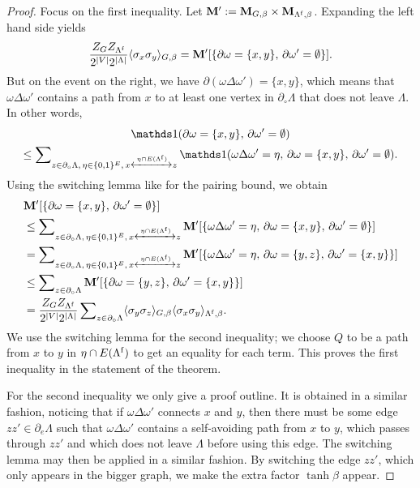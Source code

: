 \begin{proof}
    Focus on the first inequality.
    Let $\mathbf{M}':=\mathbf{M}_{G,\beta}\times\mathbf{M}_{\Lambda^{\operatorname{f}},\beta}$.
    Expanding the left hand side yields
    \[
        \frac{Z_GZ_{\Lambda^{\operatorname{f}}}}{2^{|V|}2^{|\Lambda|}}
        \langle\sigma_x\sigma_y\rangle_{G,\beta}
        =
        \mathbf{M}'[\{\partial\omega=\{x,y\},\,\partial\omega'=\emptyset\}].
    \]
    But on the event on the right,
    we have $\partial(\omega\Delta\omega')=\{x,y\}$,
    which means that $\omega\Delta\omega'$ contains a path
    from $x$ to at least one vertex in $\partial_\circ\Lambda$
    that does not leave $\Lambda$.
    In other words,
    \begin{multline}
        \true{\partial\omega=\{x,y\},\,\partial\omega'=\emptyset}
        \\
        \leq
        \sum\nolimits_{z\in\partial_\circ\Lambda,\,\eta\in\{0,1\}^E,\,x\xleftrightarrow{\eta\cap E(\Lambda^\f)}z}
        \true{\omega\Delta\omega'=\eta,\,\partial\omega=\{x,y\},\,\partial\omega'=\emptyset}.
    \end{multline}
    Using the switching lemma like for the pairing bound,
    we obtain
    \begin{align}
        &\mathbf{M}'[\{\partial\omega=\{x,y\},\,\partial\omega'=\emptyset\}]
        \\&
        \leq 
        \sum\nolimits_{z\in\partial_\circ\Lambda,\,\eta\in\{0,1\}^E,\,x\xleftrightarrow{\eta\cap E(\Lambda^{\operatorname{f}})}z}
        \mathbf{M}'[
        \{\omega\Delta\omega'=\eta,\,\partial\omega=\{x,y\},\,\partial\omega'=\emptyset\}]
        \\&
        =
        \sum\nolimits_{z\in\partial_\circ\Lambda,\,\eta\in\{0,1\}^E,\,x\xleftrightarrow{\eta\cap E(\Lambda^{\operatorname{f}})}z}
        \mathbf{M}'[
        \{\omega\Delta\omega'=\eta,\,\partial\omega=\{y,z\},\,\partial\omega'=\{x,y\}\}]
        \\&
        \leq
        \sum\nolimits_{z\in\partial_\circ\Lambda}
        \mathbf{M}'[
        \{\partial\omega=\{y,z\},\,\partial\omega'=\{x,y\}\}]
        \\&=
        \frac{Z_GZ_{\Lambda^{\operatorname{f}}}}{2^{|V|}2^{|\Lambda|}}
        \sum\nolimits_{z\in\partial_\circ\Lambda}
        \langle\sigma_y\sigma_z\rangle_{G,\beta}
        \langle\sigma_x\sigma_y\rangle_{\Lambda^{\operatorname{f}},\beta}.
    \end{align}
    We use the switching lemma for the second inequality;
    we choose $Q$ to be a path from $x$ to $y$ in $\eta\cap E(\Lambda^{\operatorname{f}})$
    to get an equality for each term.
    This proves the first inequality in the statement of the theorem.

    For the second inequality we only give a proof outline.
    It is obtained in a similar fashion,
    noticing that if $\omega\Delta\omega'$ connects
    $x$ and $y$,
    then there must be some edge $zz'\in\partial_e\Lambda$
    such that $\omega\Delta\omega'$ contains a self-avoiding path
    from $x$ to $y$, which passes through $zz'$ 
    and which does not leave $\Lambda$ before using this edge.
    The switching lemma may then be applied in a similar fashion.
    By switching the edge $zz'$, which only appears in the bigger
    graph,
    we make the extra factor $\tanh\beta$ appear.
\end{proof}
